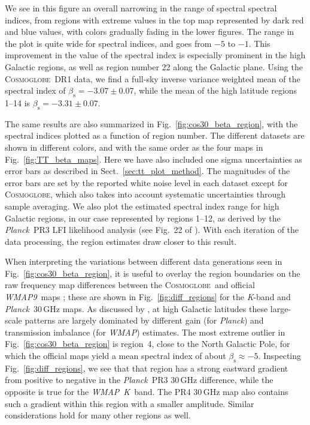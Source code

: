 \documentclass[twocolumn]{../../common/aa}
\def\WMAP{\emph{WMAP}}
\def\WMAPnine{\emph{WMAP9}}
\def\Planck{\emph{Planck}}
\newcommand{\cosmoglobe}{\textsc{Cosmoglobe}}
\newcommand{\K}[0]{\textit K}
\begin{document}
We see in this figure an overall narrowing in the range of spectral spectral indices, from regions with extreme values in the top map represented by dark red and blue values, with colors gradually fading in the lower figures. The range in the plot is quite wide for spectral indices, and goes from $-5$ to $-1$. This improvement in the value of the spectral index is especially prominent in the high Galactic regions, as well as region  number 22 along the Galactic plane.  Using the \cosmoglobe\ DR1 data, we find a full-sky inverse variance weighted mean of the spectral index of $\beta_{\mathrm{s}}=-3.07\pm0.07$, while the mean of the high latitude regions 1--14 is $\beta_{\mathrm{s}}=-3.31\pm0.07$.


The same results are also summarized in Fig.~\ref{fig:cos30_beta_region}, with the spectral indices plotted as a function of region number. The different datasets are shown in different colors, and with the same order as the four maps in Fig.~\ref{fig:TT_beta_maps}. Here we have also included one sigma uncertainties as error bars as described in Sect.~\ref{sec:tt_plot_method}. The magnitudes of the error bars are set by the reported white noise level in each dataset except for \cosmoglobe, which also takes into account systematic uncertainties through sample averaging. We also plot the estimated spectral index range for high Galactic regions, in our case represented by regions 1--12, as derived by the \Planck\ PR3 LFI likelihood analysis (see Fig.~22 of \citealp{planck2016-l05}). With each iteration of the data processing, the region estimates draw closer to this result.

When interpreting the variations between different data generations seen in Fig.~\ref{fig:cos30_beta_region}, it is useful to overlay the region boundaries on the raw frequency map differences between the \cosmoglobe\ and official \WMAPnine\ maps \citep{watts2023_dr1}; these are shown in Fig.~\ref{fig:diff_regions} for the \K-band and \Planck\ 30\,GHz maps. As discussed by \citet{watts2023_dr1}, at high Galactic latitudes these large-scale patterns are largely dominated by different gain (for \Planck) and transmission imbalance (for \WMAP) estimates. The most extreme outlier in Fig.~\ref{fig:cos30_beta_region} is region~4, close to the North Galactic Pole, for which the official maps yield a mean spectral index of about $\beta_{\mathrm{s}} \approx -5$. Inspecting Fig.~\ref{fig:diff_regions}, we see that that region has a strong eastward gradient from positive to negative in the \Planck\ PR3 30\,GHz difference, while the opposite is true for the \WMAP\ \K\ band. The PR4 30\,GHz map also contains such a gradient within this region with a smaller amplitude. Similar considerations hold for many other regions as well. 
\end{document}
